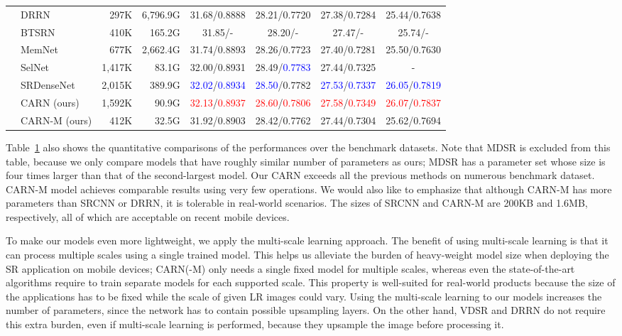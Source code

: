 \documentclass[runningheads]{llncs}
\newcommand{\blue}[1]{\textcolor{blue}{#1}}
\newcommand{\red}[1]{\textcolor{red}{#1}}
\newcommand\Bstrut{\rule[-1ex]{0pt}{0pt}}
\def\HS{\hspace{\fontdimen2\font}}
\def\HSE{\HS\HS\HS\HS\HS\HS\HS\HS}
\begin{document}
\begin{table}[t]
\begin{center}
\begin{tabular}{c l r r c c c c}
& DRRN\cite{drnn2017}      & 297K   & 6,796.9G & 31.68/0.8888 & 28.21/0.7720 & 27.38/0.7284 & 25.44/0.7638\\
& BTSRN\cite{btsrn2017}    & 410K   & 165.2G   & 31.85/-\HSE  & 28.20/-\HSE  & 27.47/-\HSE  & 25.74/-\HSE \\
& MemNet\cite{memnet}      & 677K   & 2,662.4G   & 31.74/0.8893 & 28.26/0.7723 & 27.40/0.7281 & 25.50/0.7630 \\
& SelNet\cite{selnet}      & 1,417K & 83.1G    & 32.00/0.8931 & 28.49/\blue{0.7783} & 27.44/0.7325 & - \\
& SRDenseNet\cite{srdense} & 2,015K & 389.9G   & \blue{32.02}/\blue{0.8934} & \blue{28.50}/0.7782 & \blue{27.53}/\blue{0.7337} & \blue{26.05}/\blue{0.7819} \\
& CARN (ours)              & 1,592K & 90.9G    & \red{32.13}/\red{0.8937} & \red{28.60}/\red{0.7806} & \red{27.58}/\red{0.7349}	& \red{26.07}/\red{0.7837} \\
& CARN-M (ours)            & 412K   & 32.5G    & 31.92/0.8903 & 28.42/0.7762 & 27.44/0.7304	& 25.62/0.7694\Bstrut\\\hline
\end{tabular}
\end{center}
\label{table:benchmark}
\end{table}

Table~\ref{table:benchmark} also shows the quantitative comparisons of the performances over the benchmark datasets. Note that MDSR is excluded from this table, because we only compare models that have roughly similar number of parameters as ours; MDSR has a parameter set whose size is four times larger than that of the second-largest model. Our CARN exceeds all the previous methods on numerous benchmark dataset.
CARN-M model achieves comparable results using very few operations. We would also like to emphasize that although CARN-M has more parameters than SRCNN or DRRN, it is tolerable in real-world scenarios. The sizes of SRCNN and CARN-M are 200KB and 1.6MB, respectively, all of which are acceptable on recent mobile devices.

To make our models even more lightweight, we apply the multi-scale learning approach. The benefit of using multi-scale learning is that it can process multiple scales using a single trained model. This helps us alleviate the burden of heavy-weight model size when deploying the SR application on mobile devices; CARN(-M) only needs a single fixed model for multiple scales, whereas even the state-of-the-art algorithms require to train separate models for each supported scale. This property is well-suited for real-world products because the size of the applications has to be fixed while the scale of given LR images could vary. Using the multi-scale learning to our models increases the number of parameters, since the network has to contain possible upsampling layers. On the other hand, VDSR and DRRN do not require this extra burden, even if multi-scale learning is performed, because they upsample the image before processing it.
\end{document}
